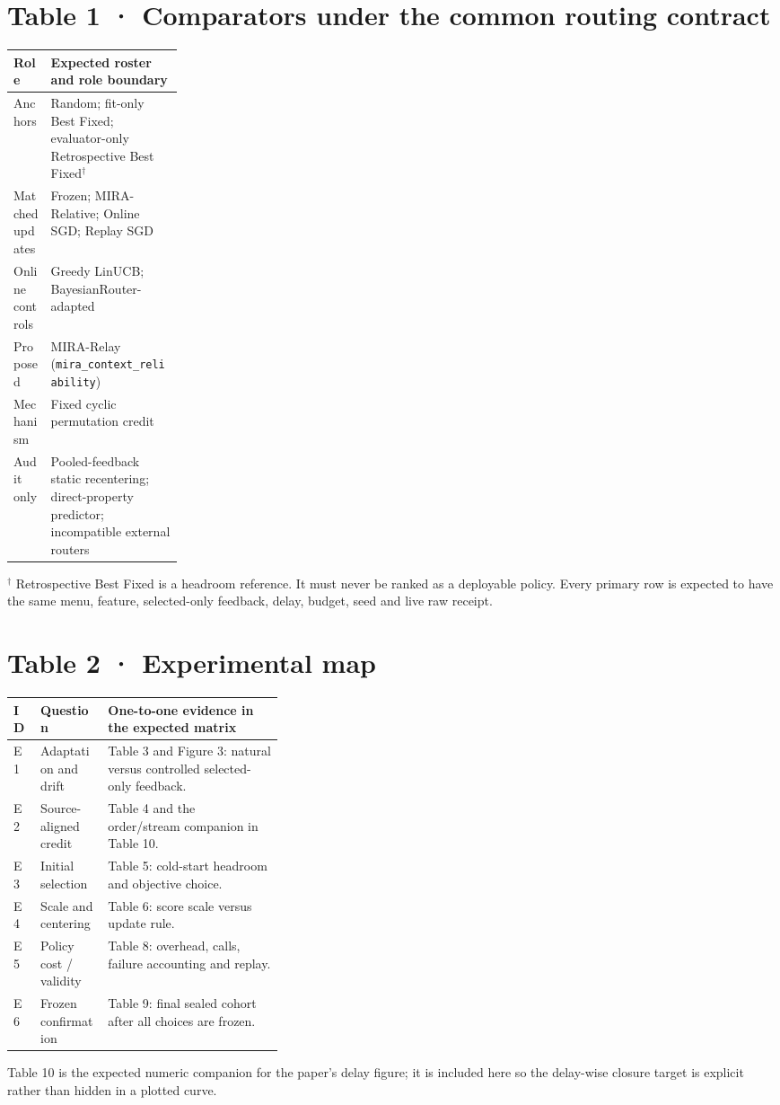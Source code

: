 \documentclass[10pt]{article}
\newcommand{\smallnote}[1]{{\footnotesize\color{Gray}#1}}
\begin{document}
\section*{Table 1 · Comparators under the common routing contract}
\begin{tabularx}{\linewidth}{@{}p{0.22\linewidth}X@{}}
\toprule
Role & Expected roster and role boundary \\
\midrule
Anchors & Random; fit-only Best Fixed; evaluator-only Retrospective Best Fixed$^{\dagger}$ \\
Matched updates & Frozen; MIRA-Relative; Online SGD; Replay SGD \\
Online controls & Greedy LinUCB; BayesianRouter-adapted \\
Proposed & MIRA-Relay (\texttt{mira\_context\_reliability}) \\
Mechanism & Fixed cyclic permutation credit \\
Audit only & Pooled-feedback static recentering; direct-property predictor; incompatible external routers \\
\bottomrule
\end{tabularx}
\smallnote{$^{\dagger}$ Retrospective Best Fixed is a headroom reference. It must never be ranked as a deployable policy. Every primary row is expected to have the same menu, feature, selected-only feedback, delay, budget, seed and live raw receipt.}

\section*{Table 2 · Experimental map}
\begin{tabularx}{\linewidth}{@{}p{0.10\linewidth}p{0.25\linewidth}X@{}}
\toprule
ID & Question & One-to-one evidence in the expected matrix \\
\midrule
E1 & Adaptation and drift & Table 3 and Figure 3: natural versus controlled selected-only feedback. \\
E2 & Source-aligned credit & Table 4 and the order/stream companion in Table 10. \\
E3 & Initial selection & Table 5: cold-start headroom and objective choice. \\
E4 & Scale and centering & Table 6: score scale versus update rule. \\
E5 & Policy cost / validity & Table 8: overhead, calls, failure accounting and replay. \\
E6 & Frozen confirmation & Table 9: final sealed cohort after all choices are frozen. \\
\bottomrule
\end{tabularx}
\smallnote{Table 10 is the expected numeric companion for the paper's delay figure; it is included here so the delay-wise closure target is explicit rather than hidden in a plotted curve.}
\end{document}
